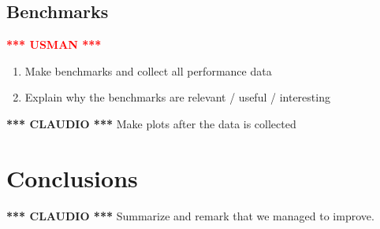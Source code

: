 \documentclass{article}
\newcommand{\usman}{\textcolor{Red}{\textbf{*** USMAN ***} }}
\newcommand{\claudio}{\textcolor{Cerulean}{\textbf{*** CLAUDIO ***} }}
\begin{document}
\subsection{Benchmarks}
\usman
\begin{enumerate}
	\item Make benchmarks and collect all performance data
	\item Explain why the benchmarks are relevant / useful / interesting
\end{enumerate}
\claudio
Make plots after the data is collected


\section{Conclusions}
\claudio
Summarize and remark that we managed to improve.

\small



\end{document}

